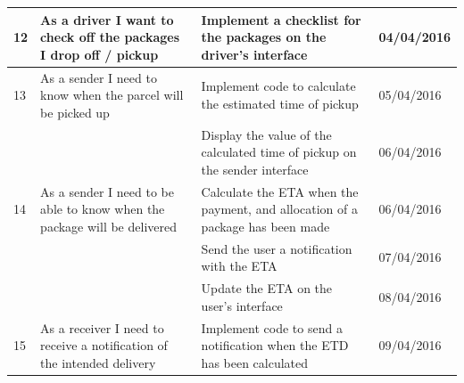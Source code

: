 \documentclass[paper=a4, fontsize=11pt]{scrartcl} %
\numberwithin{equation}{section} %
\numberwithin{figure}{section} %
\numberwithin{table}{section} %
\begin{document}
\begin{table}[!hbt]
\begin{tabular}{|p{1cm}|p{5cm}|p{5cm}|p{2cm}|}
12          & As a driver I want to check off the packages I drop off / pickup           & Implement a checklist for the packages on the driver's interface                                 & 04/04/2016    \\ \hline
13          & As a sender I need to know when the parcel will be picked up               & Implement code to calculate the estimated time of pickup                                         & 05/04/2016    \\ \hline
            &                                                                            & Display the value of the calculated time of pickup on the sender interface                       & 06/04/2016    \\ \hline
14          & As a sender I need to be able to know when the package will be delivered   & Calculate the ETA when the payment, and allocation of a package has been made                    & 06/04/2016    \\ \hline
            &                                                                            & Send the user a notification with the ETA                                                        & 07/04/2016    \\ \hline
            &                                                                            & Update the ETA on the user's interface                                                           & 08/04/2016    \\ \hline
15          & As a receiver I need to receive a notification of the intended delivery    & Implement code to send a notification when the ETD has been calculated                           & 09/04/2016    \\ \hline
\end{tabular}
\end{table}
\end{document}
